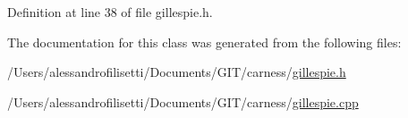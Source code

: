 Definition at line 38 of file gillespie.\-h.



The documentation for this class was generated from the following files\-:\begin{DoxyCompactItemize}
\item 
/\-Users/alessandrofilisetti/\-Documents/\-G\-I\-T/carness/\hyperlink{a00088}{gillespie.\-h}\item 
/\-Users/alessandrofilisetti/\-Documents/\-G\-I\-T/carness/\hyperlink{a00087}{gillespie.\-cpp}\end{DoxyCompactItemize}
